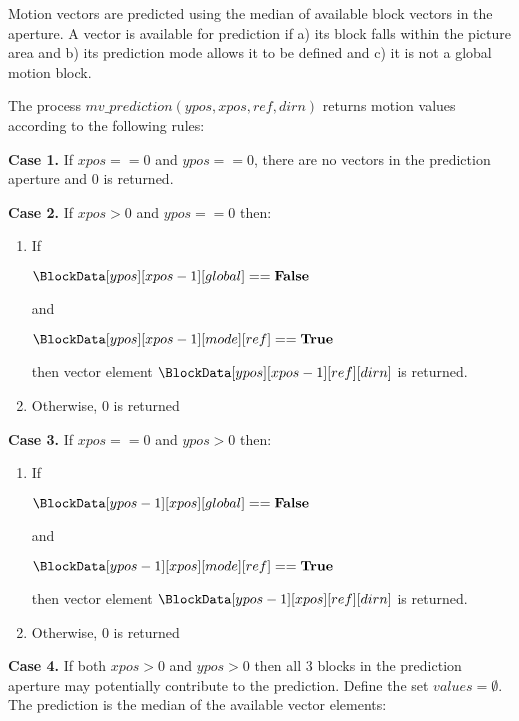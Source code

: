 Motion vectors are predicted using the median of available block vectors in the aperture. A vector is available for
prediction if a) its block falls within the picture area and b) its prediction mode allows it to be defined and c) it
is not a global motion block. 

The process $mv\_prediction(ypos, xpos, ref, dirn)$ returns motion values according to
the following rules:

{\bf Case 1.}  If $xpos==0$ and $ypos==0$, there are no vectors in the prediction aperture and
 $0$ is returned.

{\bf Case 2.} If $xpos>0$ and $ypos==0$ then:
\begin{enumerate}
   \item If 

$\BlockData[ypos][xpos-1][global]==\false$ 

and 

$\BlockData[ypos][xpos-1][mode][ref]==\true$ 

then vector element $\BlockData[ypos][xpos-1][ref][dirn]$ is returned.

   \item Otherwise, $0$ is returned
\end{enumerate}

{\bf Case 3.} If $xpos==0$ and $ypos>0$ then:
\begin{enumerate}
   \item If 

$\BlockData[ypos-1][xpos][global]==\false$ 

and 

$\BlockData[ypos-1][xpos][mode][ref]==\true$

then vector element $\BlockData[ypos-1][xpos][ref][dirn]$ is returned.

   \item Otherwise, $0$ is returned
\end{enumerate}

{\bf Case 4.} If both $xpos>0$ and $ypos>0$ then all 3 blocks in the prediction aperture may potentially
contribute to the prediction. Define the set $values=\emptyset$. The prediction is the 
median of the available vector elements:

\begin{pseudo*}
    \bsIF{\BlockData[ypos][xpos-1][global]==\false}
        \bsIF{\BlockData[ypos][xpos-1][mode][ref]==\true}
        \bsEND
    \bsEND
    \bsIF{\BlockData[ypos-1][xpos][global]==\false}
        \bsIF{\BlockData[ypos-1][xpos][mode][ref]==\true}
        \bsEND
    \bsEND
    \bsIF{\BlockData[ypos-1][xpos-1][global]==\false}
        \bsIF{\BlockData[ypos-1][xpos-1][mode][ref]==\true}
        \bsEND
    \bsEND

\bsEND
\end{pseudo*}

